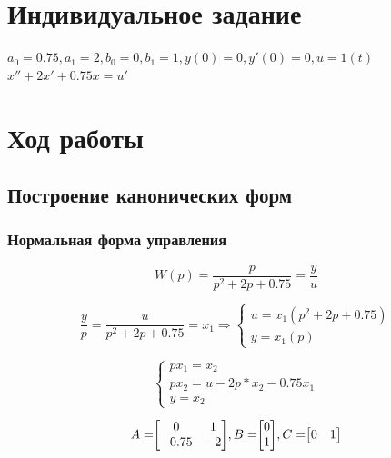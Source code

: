 \documentclass[14pt,a4paper,report]{report}
\begin{document}
\section{Индивидуальное задание}

$a_0=0.75,a_1=2,b_0=0,b_1=1,  y(0)=0, y'(0)=0, u=1(t)$
\\
$
x''+2x'+0.75x=u'
$


\section{Ход работы}

\subsection{Построение канонических форм}

\subsubsection{Нормальная форма управления}

\begin{equation*}
\text{$W(p)=\frac{p}{p^2+2p+0.75}=\frac{y}{u}$}
\end{equation*}

\begin{equation*}
\text{$\frac{y}{p}=\frac{u}{p^2+2p+0.75}=x_1$}
\Longrightarrow
\begin{cases}
	\text{$u=x_1(p^2+2p+0.75)$} \\
	\text{$y=x_1(p)$}
\end{cases}
\end{equation*}

\begin{equation*}
\begin{cases}
	\text{$px_1=x_2$} \\
	\text{$px_2=u-2p*x_2-0.75x_1$}\\
	\text{$y=x_2$}
\end{cases}
\end{equation*}

\begin{equation*}
\text{$A=$}
\text{$
\begin{bmatrix}
0 & 1 \\
-0.75 & -2 \\
\end{bmatrix}
$}
\text{$, B=$}
\text{$
\begin{bmatrix}
0 \\
1 \\
\end{bmatrix}
$}
\text{$, C=$}
\text{$
\begin{bmatrix}
0 & 1 \\
\end{bmatrix}
$}
\end{equation*}
\end{document}
